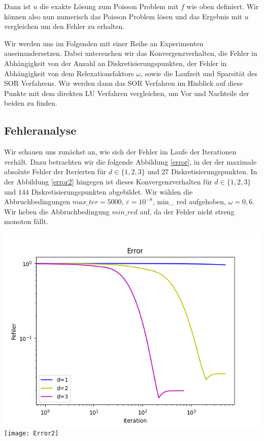 \documentclass[smallheadings]{scrartcl}
\theoremstyle{definition}
\begin{document}
Dann ist $u$ die exakte Lösung zum Poisson Problem mit $f$ wie oben definiert. Wir können also nun numerisch das Poisson Problem lösen und das Ergebnis mit $u$ vergleichen um den Fehler zu erhalten. \cbend

Wir werden uns im Folgenden mit einer Reihe an Experimenten auseinandersetzen.  Dabei untersuchen wir das Konvergenzverhalten, die Fehler in Abhängigkeit von der Anzahl an Diskretisierungspunkten,  der Fehler in Abhängigkeit von dem Relexationsfaktors $\omega $, sowie die Laufzeit und Sparsität des SOR Verfahrens. Wir werden dann das SOR Verfahren im Hinblick auf diese Punkte mit dem direkten LU Verfahren vergleichen, um Vor und Nachteile der beiden zu finden.
\subsection{Fehleranalyse}
Wir schauen uns zunächst an, wie sich der Fehler im Laufe der Iterationen verhält. Dazu betrachten wir die folgende Abbildung \ref{error}, in der der maximale absolute Fehler der Iterierten für $d\in\{1,2,3\}$ und $27$ Diskretisierungspunkten. In der Abbildung \ref{error2} hingegen ist dieses Konvergenzverhalten für $d\in\{1,2,3\}$ und $144$ Diskretisierungspunkten abgebildet. Wir wählen die Abbruchbedingungen $max\_ter=5000$, $\varepsilon =10^{-8}$, min\_ red aufgehoben, $\omega =0,6$. Wir heben die Abbruchbedingung $min\_red $ auf, da der Fehler nicht streng monoton fällt.




\begin{minipage}{\textwidth}

 \centering
 \includegraphics[scale = 0.9]{Error1}
 	\label{error}
 	\texttt{[image: Error2]}
 	\label{error2}

 \end{minipage}
 
\end{document}
